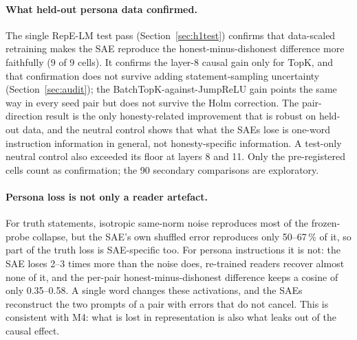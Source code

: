 \paragraph{What held-out persona data confirmed.} The single RepE-LM test pass (Section~\ref{sec:h1test}) confirms
that data-scaled retraining makes the SAE reproduce the honest-minus-dishonest difference more faithfully (9 of 9
cells). It confirms the layer-8 causal gain only for TopK, and that confirmation does not survive adding
statement-sampling uncertainty (Section~\ref{sec:audit}); the BatchTopK-against-JumpReLU gain points the same way in
every seed pair but does not survive the Holm correction. The pair-direction result is the only honesty-related
improvement that is robust on held-out data, and the neutral control shows that what the SAEs lose is one-word
instruction information in general, not honesty-specific information. A test-only neutral control also exceeded its floor at
layers 8 and 11. Only the pre-registered cells count as confirmation; the 90 secondary comparisons are exploratory.

\paragraph{Persona loss is not only a reader artefact.} For truth statements, isotropic same-norm noise reproduces most of the
frozen-probe collapse, but the SAE's own shuffled error reproduces only 50--67\,\% of it, so part of the truth loss is
SAE-specific too. For persona instructions it is not: the SAE loses 2--3 times more than the noise does,
re-trained readers recover almost none of it, and the per-pair honest-minus-dishonest difference keeps a cosine of only
0.35--0.58. A single word changes these activations, and the SAEs reconstruct the two prompts of a pair with errors
that do not cancel. This is consistent with M4: what is lost in representation is also what leaks out of the causal
effect.

